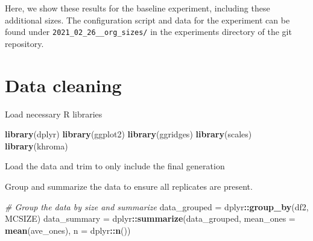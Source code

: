 \documentclass[]{book}
\newenvironment{Shaded}{\begin{snugshade}}{\end{snugshade}}
\newcommand{\CommentTok}[1]{\textcolor[rgb]{0.56,0.35,0.01}{\textit{#1}}}
\newcommand{\DataTypeTok}[1]{\textcolor[rgb]{0.13,0.29,0.53}{#1}}
\newcommand{\DecValTok}[1]{\textcolor[rgb]{0.00,0.00,0.81}{#1}}
\newcommand{\KeywordTok}[1]{\textcolor[rgb]{0.13,0.29,0.53}{\textbf{#1}}}
\newcommand{\NormalTok}[1]{#1}
\newcommand{\OperatorTok}[1]{\textcolor[rgb]{0.81,0.36,0.00}{\textbf{#1}}}
\newcommand{\StringTok}[1]{\textcolor[rgb]{0.31,0.60,0.02}{#1}}
\begin{document}
Here, we show these results for the baseline experiment, including these additional sizes.
The configuration script and data for the experiment can be found under \texttt{2021\_02\_26\_\_org\_sizes/} in the experiments directory of the git repository.

\hypertarget{data-cleaning}{%
\section{Data cleaning}\label{data-cleaning}}

Load necessary R libraries

\begin{Shaded}
\begin{Highlighting}[]
\KeywordTok{library}\NormalTok{(dplyr)}
\KeywordTok{library}\NormalTok{(ggplot2)}
\KeywordTok{library}\NormalTok{(ggridges)}
\KeywordTok{library}\NormalTok{(scales)}
\KeywordTok{library}\NormalTok{(khroma)}
\end{Highlighting}
\end{Shaded}

Load the data and trim to only include the final generation

\begin{Shaded}
\end{Shaded}

Group and summarize the data to ensure all replicates are present.

\begin{Shaded}
\begin{Highlighting}[]
\CommentTok{# Group the data by size and summarize}
\NormalTok{data_grouped =}\StringTok{ }\NormalTok{dplyr}\OperatorTok{::}\KeywordTok{group_by}\NormalTok{(df2, MCSIZE)}
\NormalTok{data_summary =}\StringTok{ }\NormalTok{dplyr}\OperatorTok{::}\KeywordTok{summarize}\NormalTok{(data_grouped, }\DataTypeTok{mean_ones =} \KeywordTok{mean}\NormalTok{(ave_ones), }\DataTypeTok{n =}\NormalTok{ dplyr}\OperatorTok{::}\KeywordTok{n}\NormalTok{())}
\end{Highlighting}
\end{Shaded}
\end{document}

